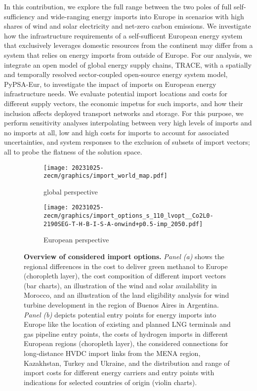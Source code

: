 
In this contribution, we explore the full range between the two poles of full
self-sufficiency and wide-ranging energy imports into Europe in scenarios with
high shares of wind and solar electricity and net-zero carbon emissions. We
investigate how the infrastructure requirements of a self-sufficent European
energy system that exclusively leverages domestic resources from the continent
may differ from a system that relies on energy imports from outside of Europe.
For our analysis, we integrate an open model of global energy supply chains,
TRACE,\cite{hamppImportOptions2023} with a spatially and temporally resolved
sector-coupled open-source energy system model,
PyPSA-Eur,\cite{PyPSAEurSecSectorCoupled} to investigate the impact of imports
on European energy infrastructure needs. We evaluate potential import locations
and costs for different supply vectors, the economic impetus for such imports,
and how their inclusion affects deployed transport networks and storage. For
this purpose, we perform sensitivity analyses interpolating between very high
levels of imports and no imports at all, low and high costs for imports to
account for associated uncertainties, and system responses to the exclusion of
subsets of import vectors; all to probe the flatness of the solution space.


\begin{figure*} 
    \begin{subfigure}[t]{\textwidth}
        \caption{global perspective}
        \label{fig:options:global}
        \texttt{[image: 20231025-zecm/graphics/import\_world\_map.pdf]}
    \end{subfigure}
    \begin{subfigure}[t]{\textwidth}
        \caption{European perspective}
        \label{fig:options:europe}
        \centering
        \texttt{[image: 20231025-zecm/graphics/import\_options\_s\_110\_lvopt\_\_Co2L0-2190SEG-T-H-B-I-S-A-onwind+p0.5-imp\_2050.pdf]}
    \end{subfigure}
    \caption{\textbf{Overview of considered import options.}
        \textit{Panel (a)} shows the regional differences in the cost to deliver
        green methanol to Europe (choropleth layer), the cost composition of
        different import vectors (bar charts), an illustration of the wind and
        solar availability in Morocco, and an illustration of the land
        eligibility analysis for wind turbine development in the region of
        Buenos Aires in Argentina. \textit{Panel (b)} depicts potential entry
        points for energy imports into Europe like the location of existing and
        planned LNG terminals and gas pipeline entry points, the costs of
        hydrogen imports in different European regions (choropleth layer), the
        considered connections for long-distance HVDC import links from the MENA
        region, Kazakhstan, Turkey and Ukraine, and the distribution and range
        of import costs for different energy carriers and entry points with
        indications for selected countries of origin (violin charts). }
    \label{fig:options}
\end{figure*}

